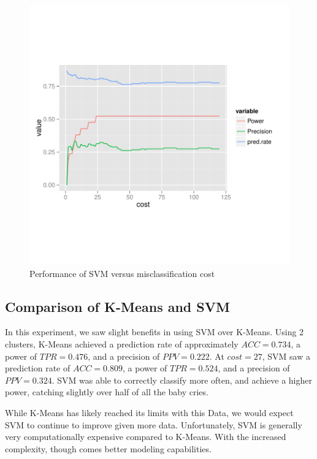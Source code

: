 \documentclass[paper=a4, fontsize=11pt]{scrartcl}
\numberwithin{equation}{section}
\numberwithin{figure}{section}
\numberwithin{table}{section}
\begin{document}
\begin{figure}[H]
\begin{center}
\vspace{-100pt}
\includegraphics[width=\textwidth]{svm_accuracy.pdf}
\vspace{-120pt}
\caption{Performance of SVM versus misclassification cost}
\end{center}
\end{figure}

\subsection{Comparison of K-Means and SVM}
In this experiment, we saw slight benefits in using SVM over K-Means. Using 2 clusters, K-Means achieved a prediction rate of approximately $ACC = 0.734$, a power of $TPR = 0.476$, and a precision of $PPV = 0.222$. At $cost = 27$, SVM saw a prediction rate of $ACC = 0.809$, a power of $TPR = 0.524$, and a precision of $PPV = 0.324$. SVM was able to correctly classify more often, and achieve a higher power, catching slightly over half of all the baby cries.

While K-Means has likely reached its limits with this Data, we would expect SVM to continue to improve given more data. Unfortunately, SVM is generally very computationally expensive compared to K-Means. With the increased complexity, though comes better modeling capabilities.
\end{document}
